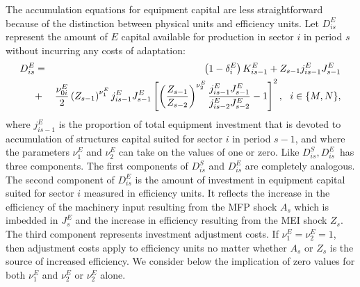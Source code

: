 \documentclass[12pt,fleqn]{article}
\begin{document}
{\normalsize The accumulation equations for equipment capital are less
straightforward because of the distinction between physical units and
efficiency units. Let $D_{is}^{E}$ represent the amount of $E$ capital
available for production in sector $i$ in period $s$ without incurring any
costs of adaptation:
\begin{eqnarray}
D_{is}^{E}&=&\left( 1-\delta_i^{E}\right)
K_{is-1}^{E}+Z_{s-1}j_{is-1}^{E}J_{s-1}^{E}  \notag \\
&+&\frac{\nu_{0i}^{E}}{2}\left( Z_{s-1}\right) ^{\nu
_{1}^{E}}j_{is-1}^{E}J_{s-1}^{E}\left[ \left( \frac{Z_{s-1}}{Z_{s-2}}\right)
^{\nu _{2}^{E}}\frac{j_{is-1}^{E}J_{s-1}^{E}}{j_{is-2}^{E}J_{s-2}^{E}}-1%
\right] ^{2},\,\,\,\,i\in \{M,N\},
\label{DiEequation}
\end{eqnarray}
where $j_{is-1}^{E}$ is the proportion of total equipment investment that is
devoted to accumulation of structures capital suited for sector $i$ in
period $s-1$, and where the parameters $\nu _{1}^{E}$ and $\nu _{2}^{E}$ can
take on the values of one or zero. Like $D_{is}^{S},D_{is}^{E}$\ has three components. The first
components of $D_{is}^{S}$ and $D_{is}^{E}$ are completely analogous. The
second component of $D_{is}^{E}$ is the amount of investment in equipment
capital suited for sector $i$ measured in efficiency units. It reflects the
increase in the efficiency of the machinery input resulting from the MFP
shock $A_s$ which is imbedded in $J_{s}^{E}$ and the increase in efficiency
resulting from the MEI shock $Z_s$. The third component represents
investment adjustment costs. If $\nu _{1}^{E}=\nu _{2}^{E}=1$, then
adjustment costs apply to efficiency units no matter whether $A_s$ or $Z_s$
is the source of increased efficiency. We consider below the implication of zero
values for both $\nu _{1}^{E}$ and $\nu _{2}^{E}$ or $\nu_{2}^E$ alone.}
\end{document}
